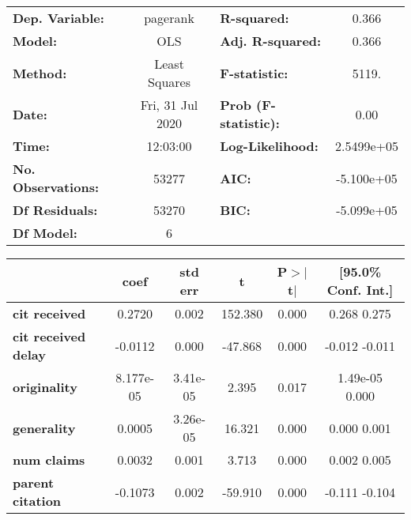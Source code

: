 \begin{center}
\begin{tabular}{lclc}
\toprule
\textbf{Dep. Variable:}     &     pagerank     & \textbf{  R-squared:         } &       0.366    \\
\textbf{Model:}             &       OLS        & \textbf{  Adj. R-squared:    } &       0.366    \\
\textbf{Method:}            &  Least Squares   & \textbf{  F-statistic:       } &       5119.    \\
\textbf{Date:}              & Fri, 31 Jul 2020 & \textbf{  Prob (F-statistic):} &       0.00     \\
\textbf{Time:}              &     12:03:00     & \textbf{  Log-Likelihood:    } &   2.5499e+05   \\
\textbf{No. Observations:}  &       53277      & \textbf{  AIC:               } &   -5.100e+05   \\
\textbf{Df Residuals:}      &       53270      & \textbf{  BIC:               } &   -5.099e+05   \\
\textbf{Df Model:}          &           6      & \textbf{                     } &                \\
\bottomrule
\end{tabular}
\begin{tabular}{lccccc}
                            & \textbf{coef} & \textbf{std err} & \textbf{t} & \textbf{P$>$$|$t$|$} & \textbf{[95.0\% Conf. Int.]}  \\
\midrule
\textbf{cit received}       &       0.2720  &        0.002     &   152.380  &         0.000        &         0.268     0.275       \\
\textbf{cit received delay} &      -0.0112  &        0.000     &   -47.868  &         0.000        &        -0.012    -0.011       \\
\textbf{originality}        &    8.177e-05  &     3.41e-05     &     2.395  &         0.017        &      1.49e-05     0.000       \\
\textbf{generality}         &       0.0005  &     3.26e-05     &    16.321  &         0.000        &         0.000     0.001       \\
\textbf{num claims}         &       0.0032  &        0.001     &     3.713  &         0.000        &         0.002     0.005       \\
\textbf{parent citation}    &      -0.1073  &        0.002     &   -59.910  &         0.000        &        -0.111    -0.104       \\

\end{tabular}
\end{center}
